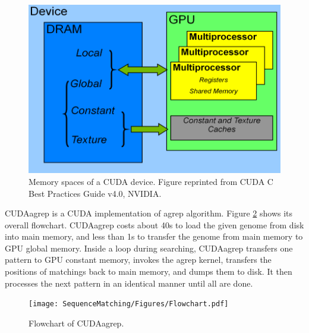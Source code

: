 \begin{figure}[t]
\centering
\includegraphics[width=\textwidth]{SequenceMatching/Figures/CUDAMemorySpaces.png}
\caption{Memory spaces of a CUDA device. Figure reprinted from CUDA C Best Practices Guide v4.0, NVIDIA.}
\label{fig:CUDAMemorySpaces}
\end{figure}

CUDAagrep is a CUDA implementation of agrep algorithm. Figure \ref{fig:CUDAagrepFlowchart} shows its overall flowchart. CUDAagrep costs about 40s to load the given genome from disk into main memory, and less than 1s to transfer the genome from main memory to GPU global memory. Inside a loop during searching, CUDAagrep transfers one pattern to GPU constant memory, invokes the agrep kernel, transfers the positions of matchings back to main memory, and dumps them to disk. It then processes the next pattern in an identical manner until all are done.

\begin{figure}
\centering
\texttt{[image: SequenceMatching/Figures/Flowchart.pdf]}
\caption{Flowchart of CUDAagrep.}
\label{fig:CUDAagrepFlowchart}
\end{figure}

